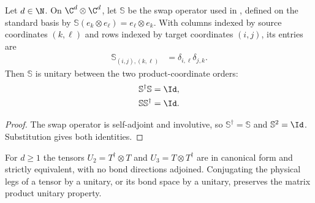 \begin{lemma}
    \label{thm:mpu_swap_matrix_unitary}
    \leanok
    Let $d\in\N$. On $\C^d\otimes\C^d$, let $\mathbb S$ be the swap operator
    used in \cite[Section~VII]{Cirac2017MPU}, defined on the standard basis by
    $\mathbb S(e_k\otimes e_\ell)=e_\ell\otimes e_k$. With columns indexed by
    source coordinates $(k,\ell)$ and rows indexed by target coordinates
    $(i,j)$, its entries are
    \begin{align}
        \mathbb S_{(i,j),(k,\ell)} & =\delta_{i,\ell}\delta_{j,k}.
    \end{align}
    Then $\mathbb S$ is unitary between the two product-coordinate orders:
    \begin{align}
        \mathbb S^\dagger\mathbb S & =\Id, \\
        \mathbb S\mathbb S^\dagger & =\Id.
    \end{align}
\end{lemma}

\begin{proof}\leanok
    The swap operator is self-adjoint and involutive, so
    $\mathbb S^\dagger=\mathbb S$ and $\mathbb S^2=\Id$. Substitution gives
    both identities.
\end{proof}

\begin{lemma}
    \label{thm:mpu_shift_products_strictly_equivalent}
    \leanok
    For $d\geq1$ the tensors $U_2=T^\dagger\otimes T$ and $U_3=T\otimes T^\dagger$ are in
    canonical form and strictly equivalent, with no bond directions adjoined.
    Conjugating the physical legs of a tensor by a unitary, or its bond space by a
    unitary, preserves the matrix product unitary property.
\end{lemma}

